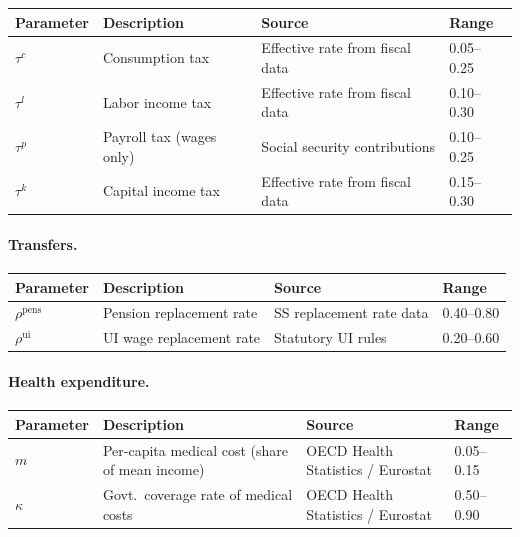 \begin{table}[H]
\centering
\small
\begin{tabular}{llll}
\toprule
Parameter & Description & Source & Range \\
\midrule
$\tau^c$ & Consumption tax & Effective rate from fiscal data & 0.05--0.25 \\
$\tau^l$ & Labor income tax & Effective rate from fiscal data & 0.10--0.30 \\
$\tau^p$ & Payroll tax (wages only) & Social security contributions & 0.10--0.25 \\
$\tau^k$ & Capital income tax & Effective rate from fiscal data & 0.15--0.30 \\
\bottomrule
\end{tabular}
\end{table}

\paragraph{Transfers.}

\begin{table}[H]
\centering
\small
\begin{tabular}{llll}
\toprule
Parameter & Description & Source & Range \\
\midrule
$\rho^{\text{pens}}$ & Pension replacement rate & SS replacement rate data & 0.40--0.80 \\
$\rho^{\text{ui}}$ & UI wage replacement rate & Statutory UI rules & 0.20--0.60 \\
\bottomrule
\end{tabular}
\end{table}

\paragraph{Health expenditure.}

\begin{table}[H]
\centering
\small
\begin{tabular}{llll}
\toprule
Parameter & Description & Source & Range \\
\midrule
$m$ & Per-capita medical cost (share of mean income) & OECD Health Statistics / Eurostat & 0.05--0.15 \\
$\kappa$ & Govt.\ coverage rate of medical costs & OECD Health Statistics / Eurostat & 0.50--0.90 \\
\bottomrule
\end{tabular}
\end{table}

